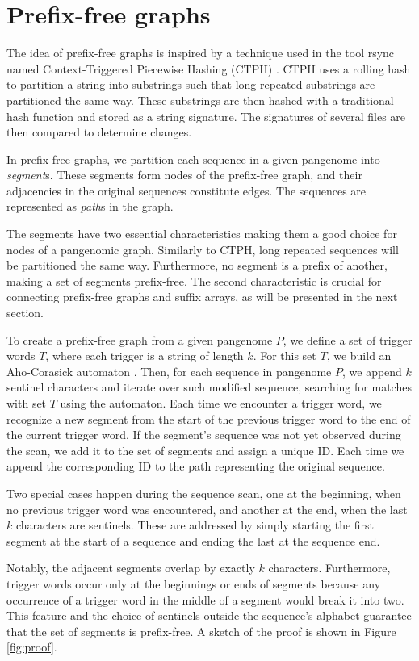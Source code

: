 \section{Prefix-free graphs}
The idea of prefix-free graphs is inspired by a technique used in the tool rsync named Context-Triggered Piecewise Hashing (CTPH) \cite{kornblum2006identifying}.
CTPH uses a rolling hash to partition a string into substrings such that long repeated substrings are partitioned the same way.
These substrings are then hashed with a traditional hash function and stored as a string signature.
The signatures of several files are then compared to determine changes.

In prefix-free graphs, we partition each sequence in a given pangenome into \emph{segment}s.
These segments form nodes of the prefix-free graph, and their adjacencies in the original sequences constitute edges.
The sequences are represented as \emph{path}s in the graph.

The segments have two essential characteristics making them a good choice for nodes of a pangenomic graph.
Similarly to CTPH, long repeated sequences will be partitioned the same way.
Furthermore, no segment is a prefix of another, making a set of segments prefix-free.
The second characteristic is crucial for connecting prefix-free graphs and suffix arrays, as will be presented in the next section.

To create a prefix-free graph from a given pangenome $P$, we define a set of trigger words $T$, where each trigger is a string of length $k$.
For this set $T$, we build an Aho-Corasick automaton \cite{aho1975efficient}.
Then, for each sequence in pangenome $P$, we append $k$ sentinel characters and iterate over such modified sequence, searching for matches with set $T$ using the automaton.
Each time we encounter a trigger word, we recognize a new segment from the start of the previous trigger word to the end of the current trigger word.
If the segment's sequence was not yet observed during the scan, we add it to the set of segments and assign a unique ID.
Each time we append the corresponding ID to the path representing the original sequence. 

Two special cases happen during the sequence scan, one at the beginning, when no previous trigger word was encountered, and another at the end, when the last $k$ characters are sentinels.
These are addressed by simply starting the first segment at the start of a sequence and ending the last at the sequence end.

Notably, the adjacent segments overlap by exactly $k$ characters.
Furthermore, trigger words occur only at the beginnings or ends of segments because any occurrence of a trigger word in the middle of a segment would break it into two.
This feature and the choice of sentinels outside the sequence's alphabet guarantee that the set of segments is prefix-free.
A sketch of the proof is shown in Figure \ref{fig:proof}.

